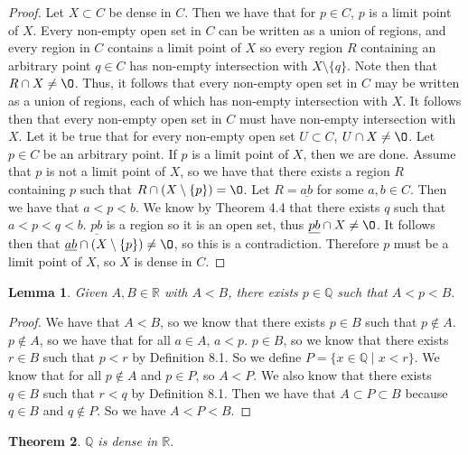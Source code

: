 \documentclass[12pt]{article}
\newcommand{\bbQ}{\mathbb{Q}}
\newcommand{\bbR}{\mathbb{R}}
\renewcommand{\emptyset}{\O}
\renewcommand{\_}[1]{\underline{ #1 }}
\newtheorem{theorem}{Theorem}[section]
\newtheorem{lemma}[theorem]{Lemma}
\theoremstyle{definition}
\numberwithin{equation}{subsection}
\begin{document}
\begin{proof}
Let $X \subset C$ be dense in $C$. Then we have that for $p \in C$, $p$ is a limit point of $X$. Every non-empty open set in $C$ can be written as a union of regions, and every region in $C$ contains a limit point of $X$ so every region $R$ containing an arbitrary point $q \in C$ has non-empty intersection with $X \setminus \{q\}$. Note then that $R \cap X \not = \emptyset$. Thus, it follows that every non-empty open set in $C$ may be written as a union of regions, each of which has non-empty intersection with $X$. It follows then that every non-empty open set in $C$ must have non-empty intersection with $X$. \newline
Let it be true that for every non-empty open set $U \subset C$, $U \cap X \not = \emptyset$. Let $p \in C$ be an arbitrary point. If $p$ is a limit point of $X$, then we are done. Assume that $p$ is not a limit point of $X$, so we have that there exists a region $R$ containing $p$ such that $R \cap (X \setminus \{p\}) = \emptyset$. Let $R = \_{ab}$ for some $a,b \in C$. Then we have that $a < p < b$. We know by Theorem 4.4 that there exists $q$ such that $a < p < q < b$. $\_{pb}$ is a region so it is an open set, thus $\_{pb} \cap X \not = \emptyset$. It follows then that $\_{ab} \cap (X \setminus \{p\}) \not = \emptyset$, so this is a contradiction. Therefore $p$ must be a limit point of $X$, so $X$ is dense in $C$.
\end{proof}

\begin{lemma} Given $A,B\in\bbR$ with $A<B$, there exists $p\in\bbQ$ such that $A<p<B.$ 
\end{lemma}

\begin{proof}
We have that $A < B$, so we know that there exists $p \in B$ such that $p \not \in A$. $p \not \in A$, so we have that for all $a \in A$, $a < p$. $p \in B$, so we know that there exists $r \in B$ such that $p < r$ by Definition 8.1. So we define $P = \{x \in \bbQ \mid x < r\}$. We know that for all $p \not \in A$ and $p \in P$, so $A < P$. We also know that there exists $q \in B$ such that $r < q$ by Definition 8.1. Then we have that $A \subset P \subset B$ because $q \in B$ and $q \not \in P$. So we have $A < P < B$.
\end{proof}

\begin{theorem}
$\bbQ$ is dense in $\bbR.$
\end{theorem}
\end{document}
